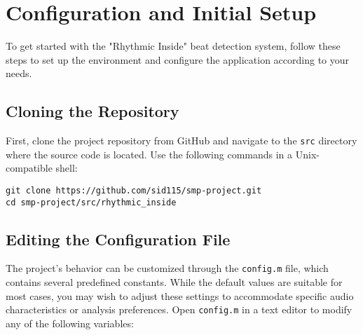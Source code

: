 \section{Configuration and Initial Setup}

To get started with the "Rhythmic Inside" beat detection system, follow these steps to set up the environment and configure the application according to your needs.

\subsection{Cloning the Repository}

First, clone the project repository from GitHub and navigate to the \texttt{src} directory where the source code is located. Use the following commands in a Unix-compatible shell:

\lstset{style=ShellStyle}
\begin{lstlisting}[caption={Cloning from GitHub}, label=lst]
git clone https://github.com/sid115/smp-project.git
cd smp-project/src/rhythmic_inside
\end{lstlisting}

\subsection{Editing the Configuration File}

The project's behavior can be customized through the \texttt{config.m} file, which contains several predefined constants. While the default values are suitable for most cases, you may wish to adjust these settings to accommodate specific audio characteristics or analysis preferences. Open \texttt{config.m} in a text editor to modify any of the following variables:

